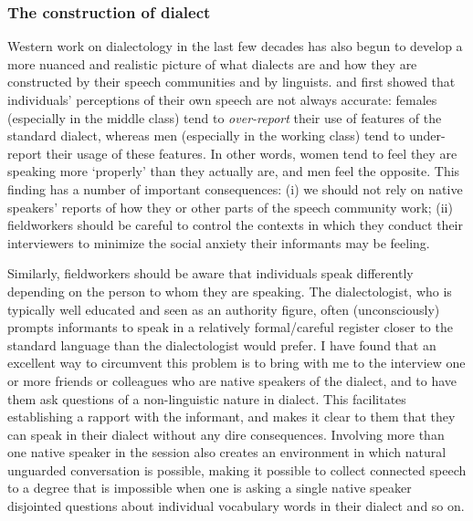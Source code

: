 \documentclass[output=paper]{langscibook}
\begin{document}
\subsubsection{The construction of dialect}\label{sec:vaux:theory:sync:dial}

Western work on dialectology in the last few decades has also begun to develop a more nuanced and realistic picture of what dialects are and how they are constructed by their speech communities and by linguists. \citet{Martin-1954-subjectiveaspectssocialstratification} and \citet{Trudgill-1972-SexcovertprestigelinguisticchangeUrbanBritishEnglishNorwich,Trudgill-1978-SociolinguisticpatternsBritishEnglish}   first showed that individuals' perceptions of their own speech are not always accurate: females (especially in the middle class) tend to \textit{over-report} their use of features of the standard dialect, whereas men (especially in the working class) tend to  under-report  their usage of these features. In other words, women tend to feel they are speaking more  `properly' than they actually are, and men feel the opposite. This finding has a number of important consequences: (i) we should not rely on native speakers' reports of how they or other parts of the speech community work; (ii) fieldworkers should be careful to control the contexts in which they conduct their interviewers to minimize the social anxiety their informants may be feeling.

Similarly, fieldworkers should be aware that individuals speak differently depending on the person to whom they are speaking. The dialectologist, who is typically well educated and seen as an authority figure, often (unconsciously) prompts informants to speak in a relatively formal/careful register closer to the standard language than the dialectologist would prefer. I have found that an excellent way to circumvent this problem is to bring with me to the interview one or more friends or colleagues who are native speakers of the dialect, and to have them ask questions of a non-linguistic nature in dialect. This facilitates establishing a rapport with the informant, and makes it clear to them that they can speak in their dialect without any dire consequences. Involving more than one native speaker in the session also creates an environment in which natural unguarded conversation is possible, making it possible to collect connected speech to a degree that is impossible when one is asking a single native speaker disjointed questions about individual vocabulary words in their dialect and so on.
\end{document}

